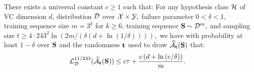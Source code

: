 \begin{theorem}\label{thm:main}
    There exists a universal constant $ c \geq1$ such that: For any hypothesis class $ \mathcal{H} $ of VC dimension $ d $, distribution $ \mathcal{D} $ over $ \mathcal{X}\times\mathcal{Y},$ failure parameter $ 0<\delta<1 $, training sequence size $ m=3^{k} $ for $ k\geq 6 $, training sequence $  \mathbf{S}\sim \mathcal{D}^{m},$ and sampling size $ t\geq4\cdot 243^{2}\ln{\left(2m/(\delta(d+\ln{\left(1/\delta \right)})) \right)},$ we have with probability at least $ 1-\delta $ over $ \mathbf{S} $ and the randomness $ \mathbf{t} $  used to draw $ \widehat{\mathcal{A}}_{\mathbf{t}}(\mathbf{S}) $ that:
    \begin{align*}
     \operatorname{\mathcal{L}}_{\mathcal{D}}^{11/243}(\widehat{\mathcal{A}}_{\mathbf{t}}(\mathbf{S}) )\leq  c\tau+\frac{c\left(d+\ln{(e/\delta )}\right)}{m}.
    \end{align*}
\end{theorem}
